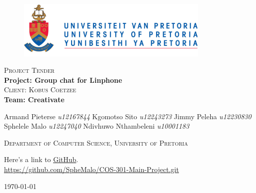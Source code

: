 \begin{titlepage}
	\begin{center}
		
		\begin{figure}[t]
			\centering
			\includegraphics[width=350px]{images/UP_Logo.png}
		\end{figure}
		
		\textsc{\large Project Tender} \\ 
		\vspace{2cm}
		\textbf{\Huge Project: Group chat for Linphone} \\ 
		\textsc{\large Client: Kobus Coetzee} \\ 
		\vspace{2cm}
		\textbf{\Huge Team: Creativate } \\ 
		
		\begin{flushright} \large
			Armand Pieterse \emph{u12167844} \newline
			Kgomotso Sito 		\emph{u12243273} \newline
			Jimmy Peleha		\emph{u12230830} \newline
			Sphelele Malo 	\emph{u12247040} \newline
			Ndivhuwo Nthambeleni 	\emph{u10001183} \newline
			\end{flushright}
		\textsc{\small Department of Computer Science, University of Pretoria}
		
		\vfill
		
	Here's a link to \href{https://github.com/SpheMalo/COS-301-Main-Project.git}{GitHub}.\\
	\url{https://github.com/SpheMalo/COS-301-Main-Project.git}

	\vfill

	{\large \today}		
		
		
	\end{center}
\end{titlepage}
